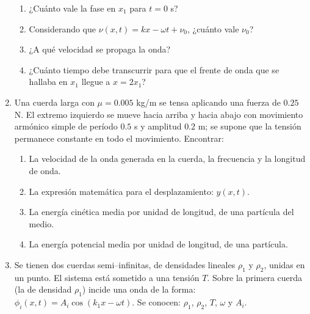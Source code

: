 \documentclass[11pt,spanish,a4paper]{article}
\begin{document}
\begin{enumerate}
\begin{enumerate}
\item ¿Cuánto vale la fase en $x_{1}$ para $t=0$ s?
\item Considerando que $\nu(x,t)=kx-\omega t+\nu_{0}$, ¿cuánto vale $\nu_{0}$?
\item ¿A qué velocidad se propaga la onda?
\item ¿Cuánto tiempo debe transcurrir para que el frente de onda que se
hallaba en $x_{1}$ llegue a $x=2x_{1}$?
\end{enumerate}
\item Una cuerda larga con $\mu=0.005$ kg/m se tensa aplicando una fuerza
de $0.25$ N. El extremo izquierdo se mueve hacia arriba y hacia abajo
con movimiento armónico simple de período $0.5$ s y amplitud $0.2$
m; se supone que la tensión permanece constante en todo el movimiento.
Encontrar:

\begin{enumerate}
\item La velocidad de la onda generada en la cuerda, la frecuencia y la
longitud de onda.
\item La expresión matemática para el desplazamiento: $y(x,t)$.
\item La energía cinética media por unidad de longitud, de una partícula
del medio.
\item La energía potencial media por unidad de longitud, de una partícula.
\end{enumerate}
\item Se tienen dos cuerdas semi--infinitas, de densidades lineales $\rho_{1}$
y $\rho_{2}$, unidas en un punto. El sistema está sometido a una
tensión $T$. Sobre la primera cuerda (la de densidad $\rho_{1}$)
incide una onda de la forma: $\phi_{i}(x,t)=A_{i}\cos\left(k_{1}x-\omega t\right)$.
Se conocen: $\rho_{1}$, $\rho_{2}$, $T$, $\omega$ y $A_{i}$.



\end{enumerate}
\end{document}
